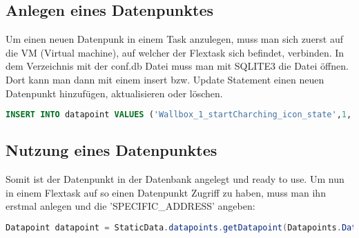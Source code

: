 \subsection{Anlegen eines Datenpunktes} 


Um einen neuen Datenpunk in einem Task anzulegen, muss man sich zuerst auf die VM (Virtual machine),  auf welcher der Flextask sich befindet, verbinden. In dem Verzeichnis mit der conf.db Datei muss man mit SQLITE3 die Datei öffnen. Dort kann man dann mit einem insert bzw. Update Statement einen neuen Datenpunkt hinzufügen, aktualisieren oder löschen.

\begin{lstlisting}[language=sql,caption=SQL Example,label=lst:impl:foo]
    INSERT INTO datapoint VALUES ('Wallbox_1_startCharching_icon_state',1,'' ,'state_[Wallbox_1_startCharching_icon]','','','INT',-1,-1,0.0,'');
\end{lstlisting}

\subsection{Nutzung eines Datenpunktes} 

Somit ist der Datenpunkt in der Datenbank angelegt und ready to use. Um nun in einem Flextask auf so einen Datenpunkt Zugriff zu haben, muss man ihn erstmal anlegen und die 'SPECIFIC\_ADDRESS' angeben:

\begin{lstlisting}[language=java,caption=Alengen eines Datenpunktes,label=lst:impl:foo]
    Datapoint datapoint = StaticData.datapoints.getDatapoint(Datapoints.DatapointField.SPECIFIC_ADDRESS, "SPECIFIC_ADDRESS_DES_DATENPUNKTES"); 
\end{lstlisting}

